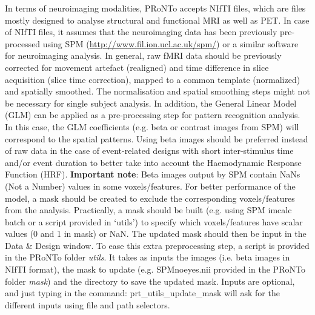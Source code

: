 In terms of neuroimaging modalities, PRoNTo accepts NIfTI files, which are files mostly designed to analyse structural and functional MRI as well as PET. In case of NIfTI files, it assumes that the neuroimaging data has been previously pre-processed using SPM (\url{http://www.fil.ion.ucl.ac.uk/spm/}) or a similar software for neuroimaging analysis. In general, raw fMRI data should be previously corrected for movement artefact (realigned) and time difference in slice acquisition (slice time correction), mapped to a common template (normalized) and spatially smoothed. The normalisation and spatial smoothing steps might not be necessary for single subject analysis. In addition, the General Linear Model (GLM) can be applied as a pre-processing step for pattern recognition analysis. In this case, the GLM coefficients (e.g. beta or contrast images from SPM) will correspond to the spatial patterns. Using beta images should be preferred instead of raw data in the case of event-related designs with short inter-stimulus time and/or event duration to better take into account the Haemodynamic Response Function (HRF). \textbf{Important note}: Beta images output by SPM contain NaNs (Not a Number) values in some voxels/features. For better performance of the model, a mask should be created to exclude the corresponding voxels/features from the analysis. Practically, a mask should be built (e.g. using SPM imcalc batch or a script provided in `utils') to specify which voxels/features have scalar values (0 and 1 in mask) or NaN. The updated mask should then be input in the Data \& Design window. To ease this extra preprocessing step, a script is provided in the PRoNTo folder \textit{utils}. It takes as inputs the images (i.e. beta images in NIfTI format), the mask to update (e.g. SPMnoeyes.nii provided in the PRoNTo folder \textit{mask}) and the directory to save the updated mask. Inputs are optional, and just typing in the \matlab{} command: prt\_utils\_update\_mask will ask for the different inputs using file and path selectors.
\\


